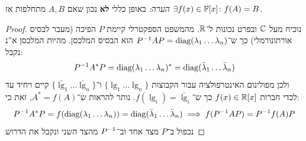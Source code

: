 \documentclass[]{../../../../tex/classes/styledArticle}
\begin{document}
	\textit{הערה: }באופן כללי \textbf{לא} נכון שאם $A, B$ מתחלפות אז $\exists f(x) \in \mathbb{F}[x] \colon f(A) = B$. 
	\begin{proof}
		נוכיח מעל $\mathbb{C}$ ובפרט נכונות ל־$\mathbb{R}$. מהמשפט הספקטרלי קיימת $P$ הפיכה (מעבר לבסיס אורתונורמלי) כך ש־$P^{-1} A P = \operatorname{diag}(\lambda_1 \dots \lambda_n)$ הוא הבסיס המלכסן. מהיות המלכסן א''נ נקבל: 
		\[ P^{-1} A^* P = \operatorname{diag}(\lambda_1 \dots \lambda_n)^* = \operatorname{diag}(\bar{\lambda}_1 \dots \bar {\lambda}_n) \]
		ולכן מפולינום האינטרפולציה עבור הקבוצות $\{\lg_1 \dots \lg_n\}$ ו־$\{\bar \lg_1 \dots \bar \lg_n\}$ קיים ויחיד עד לכדי חברות $f(x) \in \mathbb{R}[x]$ כך ש־$f(\lg_i) = \bar \lg_i$. נותר להראות ש־$A^* = f(A)$, זאת כי: 
		\[ P^{-1} A^* P = f(\operatorname{diag}(\lambda_1 \dots \lambda_n)) = \operatorname{diag}(\bar {\lambda}_1 \dots \bar {\lambda}_n) \implies f(P^{-1} A P) = P^{-1} f(A) P \]
		נכפול ב־$P$ מצד אחד וב־$P^{-1}$ מהצד השני ונקבל את הדרוש
	\end{proof}
	
	
	\ndoc
\end{document}
